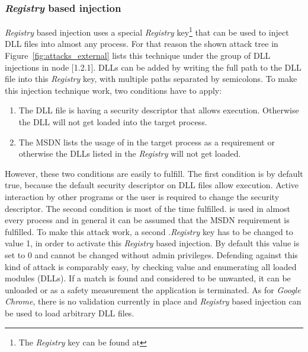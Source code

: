 \subsubsection{\emph{Registry} based injection}
\emph{Registry} based injection uses a special \emph{Registry} key\footnote{The \emph{Registry} key can be found at } that can be used to inject \gls{DLL} files into almost any process. For that reason the shown attack tree in Figure~\ref{fig:attacks_external} lists this technique under the group of \gls{DLL} injections in node [1.2.1]. \glspl{DLL} can be added by writing the full path to the \gls{DLL} file into this \emph{Registry} key, with multiple paths separated by semicolons. To make this injection technique work, two conditions have to apply:
\begin{enumerate}
\item The \gls{DLL} file is having a security descriptor that allows execution. Otherwise the \gls{DLL} will not get loaded into the target process.
\item The \gls{MSDN} \cite{msdn_appinitdlls} lists the usage of  in the target process as a requirement or otherwise the \glspl{DLL} listed in the \emph{Registry} will not get loaded.
\end{enumerate}
However, these two conditions are easily to fulfill. The first condition is by default true, because the default security descriptor on \gls{DLL} files allow execution. Active interaction by other programs or the user is required to change the security descriptor. The second condition is most of the time fulfilled.  is used in almost every process and in general it can be assumed that the \gls{MSDN} requirement is fulfilled. To make this attack work, a second .\emph{Registry} key  has to be changed to value 1, in order to activate this \emph{Registry} based injection. By default this value is set to 0 and cannot be changed without admin privileges.
Defending against this kind of attack is comparably easy, by checking  value and enumerating all loaded modules (\glspl{DLL}). If a match is found and considered to be unwanted, it can be unloaded or as a safety measurement the application is terminated. As for \emph{Google Chrome}, there is no validation currently in place and \emph{Registry} based injection can be used to load arbitrary \gls{DLL} files.
